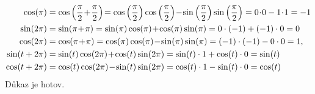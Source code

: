 \begin{důkaz}
\begin{align*}
	\cos(\pi) &= \cos\left(\pia\!+\!\pia\right)\!=\cos\left(\pia\right)\cos\left(\pia\right)\!-\!\sin\left(\pia\right)\sin\left(\pia\right)=0\!\cdot\! 0-1\!\cdot\! 1=-1 \\
	\sin(2\pi) &= \sin(\pi\!+\!\pi)=\sin(\pi)\cos(\pi)\!+\!\cos(\pi)\sin(\pi)=0\cdot(-1)+(-1)\cdot0=0 \\
	\cos(2\pi) &= \cos(\pi\!+\!\pi)=\cos(\pi)\cos(\pi)\!-\!\sin(\pi)\sin(\pi)=(-1)\cdot(-1)-0\cdot0=1, \\
	\sin(t+2\pi)&=\sin(t)\cos(2\pi)\!+\!\cos(t)\sin(2\pi)=\sin(t)\cdot 1+ \cos(t)\cdot 0 = \sin(t) \\
	\cos(t+2\pi) &= \cos(t)\cos(2\pi)\!-\!\sin(t)\sin(2\pi)=\cos(t)\cdot1-\sin(t)\cdot0 = \cos(t)
\end{align*}
Důkaz je hotov.
\end{důkaz}

